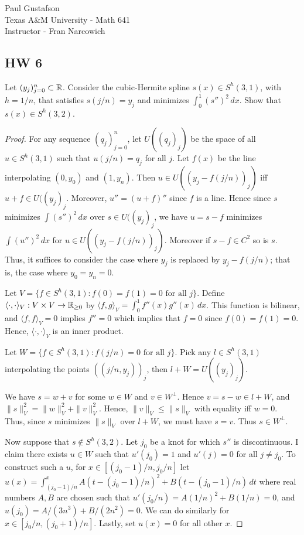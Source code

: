 \documentclass{article}
\begin{document}
\noindent Paul Gustafson\\
\noindent Texas A\&M University - Math 641\\ 
\noindent Instructor - Fran Narcowich

\subsection*{HW 6}
 Let $(y_j)_{j=0}^n \subset \mathbb{R}$. Consider the cubic-Hermite spline $s(x) \in S^h(3,1)$, with $h = 1/n$, that satisfies $s(j/n) = y_j$ and minimizes $\int_0^1 (s'')^2 \, dx$. Show that $s(x) \in S^h(3,2)$.
\begin{proof}
For any sequence $(q_j)_{j=0}^n$, let $U((q_j)_j)$ be the space of all $u \in S^h(3,1)$ such that $u(j/n) = q_j$ for all $j$.  Let $f(x)$ be the line interpolating $(0, y_0)$ and $(1, y_n)$.  Then $u \in U((y_j - f(j/n))_j)$ iff  $u + f \in U((y_j)_j$.  Moreover, $u'' = (u + f)''$ since $f$ is a line.  Hence since $s$ minimizes $\int (s'')^2 \, dx$ over $s \in U((y_j)_j$, we have $u = s - f$ minimizes $\int (u'')^2 \,dx$ for $u \in U((y_j - f(j/n))_j)$.  Moreover if $s -f \in C^2$ so is $s$.  Thus, it suffices to consider the case where $y_j$ is replaced by $y_j - f(j/n)$; that is, the case where $y_0 = y_n = 0$.

Let $V = \{f \in S^h(3,1) : f(0) = f(1) = 0 \text{ for all } j\}$.  Define $\langle \cdot, \cdot \rangle_V : V \times V \to \mathbb{R}_{\ge 0}$ by $\langle f, g \rangle_V = \int_0^1 f''(x) g''(x) \, dx$.  This function is bilinear, and $\langle f, f \rangle_V = 0$ implies $f'' = 0$ which implies that $f = 0$ since $f(0) = f(1) = 0$. Hence, $\langle \cdot, \cdot \rangle_V$ is an inner product.

Let $W = \{f \in S^h(3,1) : f(j/n) = 0 \text{ for all } j\}$.  Pick any $l \in S^h(3,1)$ interpolating the points $((j/n, y_j))_j$, then $l + W = U((y_j)_j)$.

We have $s = w + v$ for some $w \in W$ and $v \in W^\perp$.   Hence $v = s - w \in l + W$, and $\|s\|_V^2 = \|w\|_V^2 + \|v\|_V^2$.  Hence, $\|v\|_V \le \|s\|_V$ with equality iff $w = 0$.  Thus, since $s$ minimizes $\|s\|_V$ over $l + W$, we must have $s = v$.  Thus $s \in W^\perp$.

Now suppose that $s \not \in S^h(3,2)$. Let $j_0$ be a knot for which $s''$ is discontinuous.  I claim there exists $u \in W$ such that $u'(j_0) = 1$ and $u'(j) = 0$ for all $j \neq j_0$.  To construct such a $u$, for $x \in [(j_0-1)/n, j_0/n]$ let 
 $u(x) = \int_{(j_0-1)/n}^{x} A(t-(j_0-1)/n)^2 + B(t -(j_0 -1)/n) \, dt$ 
where real numbers $A, B$ are chosen such that $u'(j_0/n) = A(1/n)^2 + B(1/n) = 0$, and $u(j_0) = A/(3n^3) + B/(2n^2) = 0$.  We can do similarly for $x \in [j_0/n, (j_0+1)/n]$.  Lastly, set $u(x) = 0$ for all other $x$. 


\end{proof}
\end{document}
